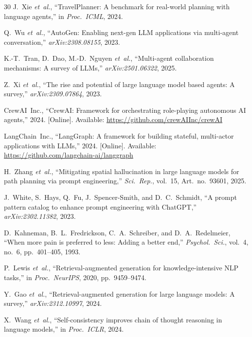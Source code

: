 \documentclass[journal]{IEEEtran}
\begin{document}
\begin{thebibliography}{30}
J.~Xie \emph{et~al.}, ``TravelPlanner: A benchmark for real-world planning with language agents,'' in \emph{Proc.\ ICML}, 2024.

Q.~Wu \emph{et~al.}, ``AutoGen: Enabling next-gen LLM applications via multi-agent conversation,'' \emph{arXiv:2308.08155}, 2023.

K.-T.~Tran, D.~Dao, M.-D.~Nguyen \emph{et~al.}, ``Multi-agent collaboration mechanisms: A survey of LLMs,'' \emph{arXiv:2501.06322}, 2025.

Z.~Xi \emph{et~al.}, ``The rise and potential of large language model based agents: A survey,'' \emph{arXiv:2309.07864}, 2023.

CrewAI~Inc., ``CrewAI: Framework for orchestrating role-playing autonomous AI agents,'' 2024. [Online]. Available: \url{https://github.com/crewAIInc/crewAI}

LangChain~Inc., ``LangGraph: A framework for building stateful, multi-actor applications with LLMs,'' 2024. [Online]. Available: \url{https://github.com/langchain-ai/langgraph}

H.~Zhang \emph{et~al.}, ``Mitigating spatial hallucination in large language models for path planning via prompt engineering,'' \emph{Sci.\ Rep.}, vol.~15, Art.~no.~93601, 2025.

J.~White, S.~Hays, Q.~Fu, J.~Spencer-Smith, and D.~C.~Schmidt, ``A prompt pattern catalog to enhance prompt engineering with ChatGPT,'' \emph{arXiv:2302.11382}, 2023.

D.~Kahneman, B.~L.~Fredrickson, C.~A.~Schreiber, and D.~A.~Redelmeier, ``When more pain is preferred to less: Adding a better end,'' \emph{Psychol.\ Sci.}, vol.~4, no.~6, pp.~401--405, 1993.

P.~Lewis \emph{et~al.}, ``Retrieval-augmented generation for knowledge-intensive NLP tasks,'' in \emph{Proc.\ NeurIPS}, 2020, pp.~9459--9474.

Y.~Gao \emph{et~al.}, ``Retrieval-augmented generation for large language models: A survey,'' \emph{arXiv:2312.10997}, 2024.

X.~Wang \emph{et~al.}, ``Self-consistency improves chain of thought reasoning in language models,'' in \emph{Proc.\ ICLR}, 2024.


\end{thebibliography}
\end{document}
